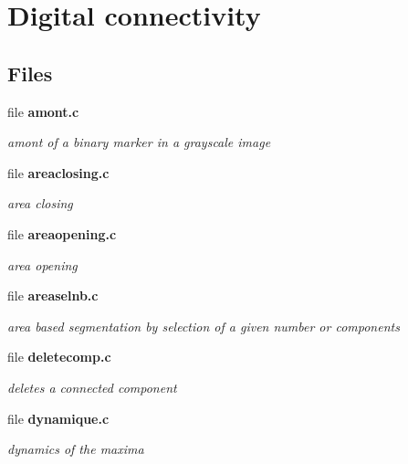 \section{Digital connectivity}
\label{group__connect}
\subsection*{Files}
\begin{CompactItemize}
\item 
file \bf{amont.c}
\begin{CompactList}\small\item\em amont of a binary marker in a grayscale image \item\end{CompactList}

\item 
file \bf{areaclosing.c}
\begin{CompactList}\small\item\em area closing \item\end{CompactList}

\item 
file \bf{areaopening.c}
\begin{CompactList}\small\item\em area opening \item\end{CompactList}

\item 
file \bf{areaselnb.c}
\begin{CompactList}\small\item\em area based segmentation by selection of a given number or components \item\end{CompactList}

\item 
file \bf{deletecomp.c}
\begin{CompactList}\small\item\em deletes a connected component \item\end{CompactList}

\item 
file \bf{dynamique.c}
\begin{CompactList}\small\item\em dynamics of the maxima \item\end{CompactList}


\end{CompactItemize}
